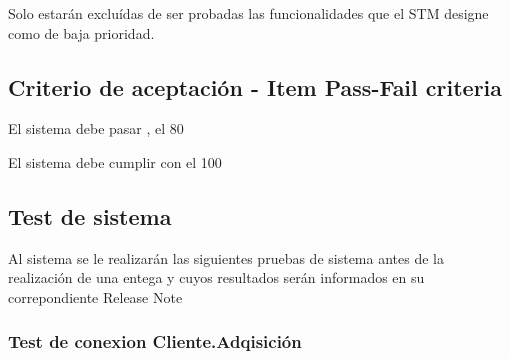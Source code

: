 Solo estarán excluídas de ser probadas las funcionalidades que el STM designe como de baja prioridad. 

\subsection{\textcolor[gray]{.2}{Criterio de aceptación - Item Pass-Fail criteria }}

El sistema debe pasar , el 80 %

El sistema debe cumplir con el 100 %

\subsection{\textcolor[gray]{.2}{Test de sistema }}

Al sistema se le realizarán las siguientes pruebas de sistema antes de la realización de una entega y cuyos resultados serán informados en su correpondiente Release Note


 \subsubsection{\textcolor[gray]{.2}{Test de conexion Cliente.Adqisición }}

